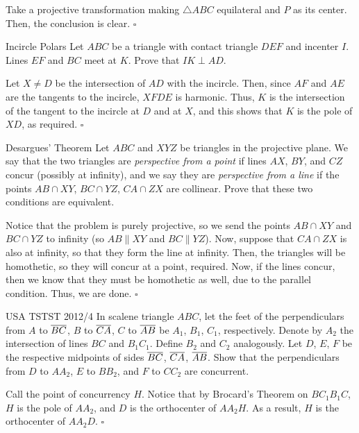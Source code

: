 \documentclass{article}
\begin{document}
Take a projective transformation making $\triangle ABC$ equilateral and $P$ as its center. Then, the conclusion is clear. $\square$

\newpage

\begin{problem}[9.40]{Incircle Polars}
Let $ABC$ be a triangle with contact triangle $DEF$ and incenter $I$. Lines $EF$ and $BC$ meet at $K$. Prove that $IK \perp AD$.
\end{problem}

Let $X \neq D$ be the intersection of $AD$ with the incircle. Then, since $AF$ and $AE$ are the tangents to the incircle, $XFDE$ is harmonic. Thus, $K$ is the intersection of the tangent to the incircle at $D$ and at $X$, and this shows that $K$ is the pole of $XD$, as required. $\square$

\begin{problem}[9.41]{Desargues' Theorem}
Let $ABC$ and $XYZ$ be triangles in the projective plane. We say that the two triangles are \emph{perspective from a point} if lines $AX$, $BY$, and
$CZ$ concur (possibly at infinity), and we say they are \emph{perspective from a line} if the points $AB \cap XY$, $BC \cap YZ$, $CA \cap ZX$ are collinear. Prove that these two conditions are equivalent.
\end{problem}

Notice that the problem is purely projective, so we send the points $AB \cap XY$ and $BC \cap YZ$ to infinity (so $AB \parallel XY$ and $BC \parallel YZ$). Now, suppose that $CA \cap ZX$ is also at infinity, so that they form the line at infinity. Then, the triangles will be homothetic, so they will concur at a point,  required. Now, if the lines concur, then we know that they must be homothetic as well, due to the parallel condition. Thus, we are done. $\square$

\begin{problem}[9.42]{USA TSTST 2012/4}
In scalene triangle $ABC$, let the feet of the perpendiculars from $A$ to $\overline{BC}$, $B$ to $\overline{CA}$, $C$ to $\overline{AB}$ be $A_1$, $B_1$, $C_1$, respectively. Denote by $A_2$ the intersection of lines $BC$ and $B_1C_1$. Define $B_2$ and $C_2$ analogously. Let $D$, $E$, $F$ be the respective midpoints of sides $\overline{BC}$, $\overline{CA}$, $\overline{AB}$. Show that the perpendiculars from $D$ to $AA_2$, $E$ to $BB_2$, and $F$ to $CC_2$ are concurrent.
\end{problem}

Call the point of concurrency $H$. Notice that by Brocard's Theorem on $BC_1B_1C$, $H$ is the pole of $AA_2$, and $D$ is the orthocenter of $AA_2H$. As a result, $H$ is the orthocenter of $AA_2D$. $\square$
\end{document}

